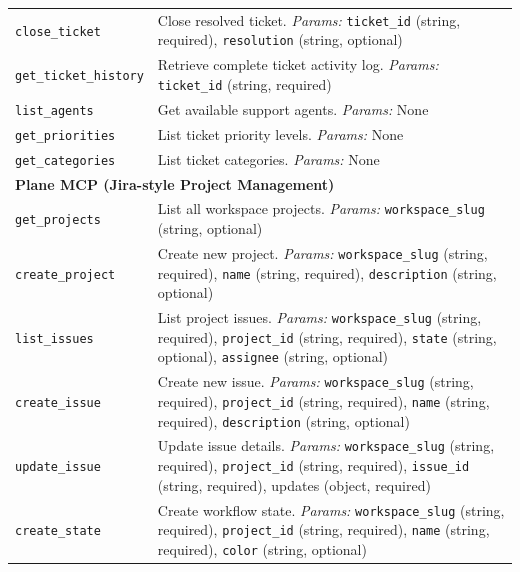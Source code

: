 \documentclass{article}
\theoremstyle{plain}
\theoremstyle{definition}
\theoremstyle{remark}
\begin{document}
{\begin{longtable}{p{4.5cm} p{10cm}}
\texttt{close\_ticket} & Close resolved ticket. \textit{Params:} \texttt{ticket\_id} (string, required), \texttt{resolution} (string, optional) \\

\texttt{get\_ticket\_history} & Retrieve complete ticket activity log. \textit{Params:} \texttt{ticket\_id} (string, required) \\

\texttt{list\_agents} & Get available support agents. \textit{Params:} None \\

\texttt{get\_priorities} & List ticket priority levels. \textit{Params:} None \\

\texttt{get\_categories} & List ticket categories. \textit{Params:} None \\

\multicolumn{2}{l}{\textbf{Plane MCP (Jira-style Project Management)}} \\
\texttt{get\_projects} & List all workspace projects. \textit{Params:} \texttt{workspace\_slug} (string, optional) \\

\texttt{create\_project} & Create new project. \textit{Params:} \texttt{workspace\_slug} (string, required), \texttt{name} (string, required), \texttt{description} (string, optional) \\

\texttt{list\_issues} & List project issues. \textit{Params:} \texttt{workspace\_slug} (string, required), \texttt{project\_id} (string, required), \texttt{state} (string, optional), \texttt{assignee} (string, optional) \\

\texttt{create\_issue} & Create new issue. \textit{Params:} \texttt{workspace\_slug} (string, required), \texttt{project\_id} (string, required), \texttt{name} (string, required), \texttt{description} (string, optional) \\

\texttt{update\_issue} & Update issue details. \textit{Params:} \texttt{workspace\_slug} (string, required), \texttt{project\_id} (string, required), \texttt{issue\_id} (string, required), updates (object, required) \\

\texttt{create\_state} & Create workflow state. \textit{Params:} \texttt{workspace\_slug} (string, required), \texttt{project\_id} (string, required), \texttt{name} (string, required), \texttt{color} (string, optional) \\


\end{longtable}}
\end{document}

